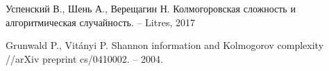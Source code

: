 \documentclass[../main.tex]{subfiles}
\begin{document}
\begin{thebibliography}{99}
	Успенский В., Шень А., Верещагин Н. Колмогоровская сложность и алгоритмическая случайность. – Litres, 2017

Grunwald P., Vitányi P. Shannon information and Kolmogorov complexity //arXiv preprint cs/0410002. – 2004.
\end{thebibliography}
\end{document}
